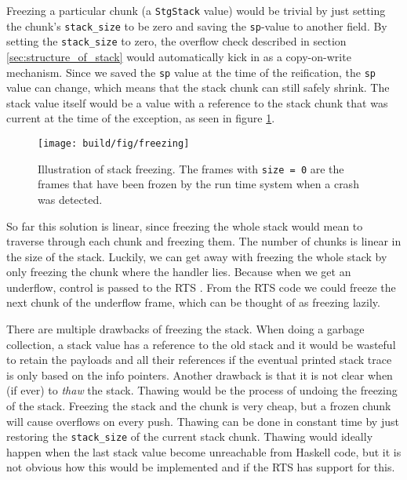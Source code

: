 Freezing a particular chunk (a \texttt{StgStack} value) would be
trivial by just setting the chunk's \texttt{stack\_size} to be zero
and saving the \texttt{sp}-value to another field. By setting
the \texttt{stack\_size} to zero, the overflow check described in
section \ref{sec:structure_of_stack} would automatically kick in as a
copy-on-write mechanism. Since we saved the \texttt{sp} value at the time of the reification,
the \texttt{sp} value can change, which means that the stack chunk
can still safely shrink. The stack value itself would be a value with
a reference to the stack chunk that was current at the time of the
exception, as seen in figure \ref{fig:freezing}.

\begin{figure}
\begin{mdframed}
  \texttt{[image: build/fig/freezing]}
  \caption{Illustration of stack freezing. The frames with \texttt{size = 0}
    are the frames that have been frozen by the run time system when a crash
    was detected.}
  \label{fig:freezing}
\end{mdframed}
\end{figure}

So far this solution is linear, since freezing the whole stack would mean
to traverse through each chunk and freezing them. The number of chunks is
linear in the size of the stack. Luckily, we can get away with freezing
the whole stack by only freezing the chunk where the handler lies.
Because when we get an underflow, control is passed to the RTS
\cite{github_underflow_frame}. From the RTS code we could freeze
the next chunk of the underflow frame, which can be thought of as freezing lazily.

There are multiple drawbacks of freezing the stack. When doing a garbage
collection, a stack value has a reference to the old stack and it would
be wasteful to retain the payloads and all their references if the
eventual printed stack trace is only based on the info pointers. Another
drawback is that it is not clear when (if ever) to \emph{thaw} the
stack. Thawing would be the process of undoing the freezing of the
stack. Freezing the stack and the chunk is very cheap, but a frozen chunk
will cause overflows on every push. Thawing can be done in
constant time by just restoring the \texttt{stack\_size} of the current
stack chunk. Thawing would ideally happen when the last stack value
become unreachable from Haskell code, but it is not obvious how this
would be implemented and if the RTS has support for this.

